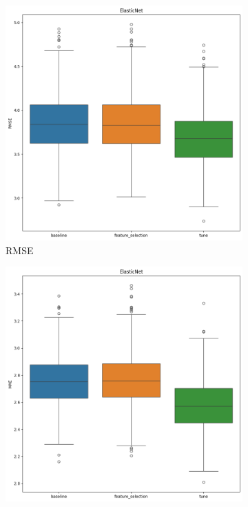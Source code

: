 \documentclass[12pt]{article}
\begin{document}
\begin{figure}[H]
    \centering
    \begin{subfigure}{0.3\textwidth}
        \centering
        \includegraphics[width=\linewidth]{ims/elasticnet_rmse.png}
        \caption{RMSE}
        \label{fig:elasticnet_rmse}
    \end{subfigure}
    \begin{subfigure}{0.3\textwidth}
        \centering
        \includegraphics[width=\linewidth]{ims/elasticnet_mae.png}

\end{subfigure}
\end{figure}
\end{document}
